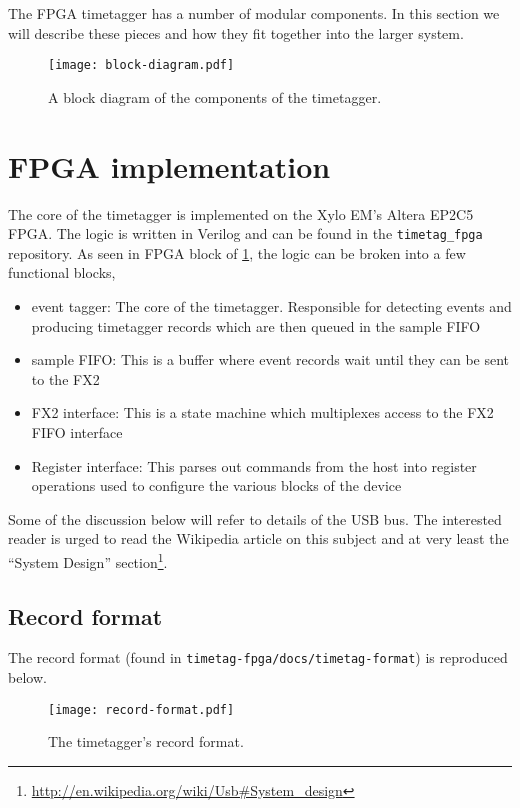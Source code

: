 The FPGA timetagger has a number of modular components. In this
section we will describe these pieces and how they fit together into
the larger system.

\begin{figure}
  \center
  \texttt{[image: block-diagram.pdf]}
  \caption{A block diagram of the components of the timetagger.}
  \label{Fig:BlockDiagram}
\end{figure}

\section{FPGA implementation}
The core of the timetagger is implemented on the Xylo EM's Altera
EP2C5 FPGA. The logic is written in Verilog and can be found in the
{\tt timetag\_fpga} repository. As seen in FPGA block of
\ref{Fig:BlockDiagram}, the logic can be broken into a few functional
blocks,

\begin{itemize}
  \item event tagger: The core of the timetagger. Responsible for
    detecting events and producing timetagger records which are then
    queued in the sample FIFO
  \item sample FIFO: This is a buffer where event records wait until
    they can be sent to the FX2
  \item FX2 interface: This is a state machine which multiplexes
    access to the FX2 FIFO interface
  \item Register interface: This parses out commands from the host
    into register operations used to configure the various blocks of
    the device
\end{itemize}

Some of the discussion below will refer to details of the USB bus. The
interested reader is urged to read the Wikipedia article on this
subject and at very least the ``System Design''
section\footnote{\url{http://en.wikipedia.org/wiki/Usb\#System\_design}}.

\subsection{Record format}
The record format (found in {\tt timetag-fpga/docs/timetag-format}) is
reproduced below.

\begin{figure}
  \center
  \texttt{[image: record-format.pdf]}
  \caption{The timetagger's record format.}
  \label{Fig:RecordFormat}
\end{figure}

